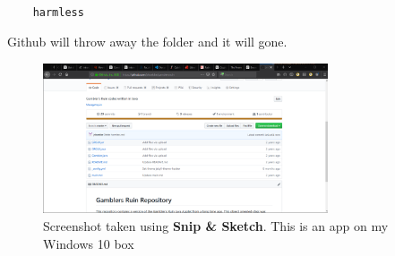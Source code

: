 \documentclass[10pt,fleqn]{article}
\begin{document}
\begin{verbatim}

    harmless

\end{verbatim}
Github will throw away the folder and it will gone.
\begin{figure}[h]
\centering
\includegraphics[width=0.75\textwidth]{../images/github_17.png}
\caption{{Screenshot} taken using {\bf Snip \& Sketch}. This is an app on
         my Windows 10 box}
\end{figure}
\end{document}
